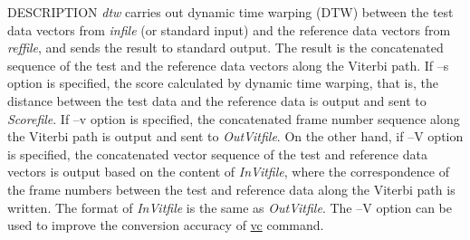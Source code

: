 \begin{qsection}{DESCRIPTION}
 {\em dtw} carries out dynamic time warping (DTW) between the test data vectors from
 {\em infile} (or standard input) and the reference data vectors from {\em reffile},
 and sends the result to standard output.  The result is the concatenated sequence of
 the test and the reference data vectors along the Viterbi path.  If --s option is
 specified, the score calculated by dynamic time warping, that is, the distance
 between the test data and the reference data is output and sent to {\em Scorefile}.
 If --v option is specified, the concatenated frame number sequence along the Viterbi
 path is output and sent to {\em OutVitfile}.  On the other hand, if --V option is
 specified, the concatenated vector sequence of the test and reference data vectors
 is output based on the content of {\em InVitfile}, where the correspondence of the
 frame numbers between the test and reference data along the Viterbi path is written.
 The format of {\em InVitfile} is the same as {\em OutVitfile}.  The --V option can
 be used to improve the conversion accuracy of \hyperlink{vc}{vc} command.


\end{qsection}
